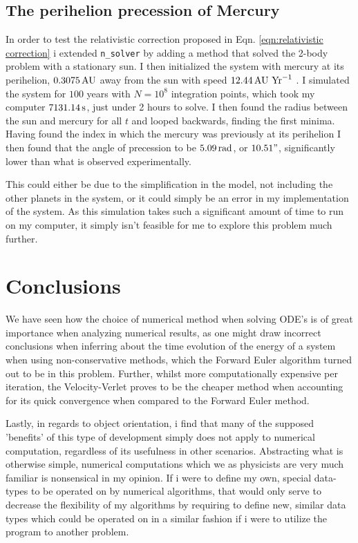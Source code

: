 \documentclass[10pt,showpacs,preprintnumbers,amsmath,amssymb,nofootinbib,aps,prl,twocolumn,groupedaddress,superscriptaddress,showkeys]{revtex4-1}
\begin{document}
\subsection{The perihelion precession of Mercury}
  In order to test the relativistic correction proposed in Eqn. \ref{eqn:relativistic correction} i extended \lstinline{n_solver} by adding a method that solved the 2-body problem with a stationary sun. I then initialized the system with mercury at its perihelion, $0.3075\,\textup{AU}$ away from the sun with speed $12.44\, \textup{AU Yr}^{-1}$ \cite{problem_set}. I simulated the system for $100$ years with $N=10^8$ integration points, which took my computer $7131.14\,\textup s$, just under 2 hours to solve. I then found the radius between the sun and mercury for all $t$ and looped backwards, finding the first minima. Having found the index in which the mercury was previously at its perihelion I then found that the angle of precession to be $5.09\,\textup{rad}$, or $10.51"$, significantly lower than what is observed experimentally.

  This could either be due to the simplification in the model, not including the other planets in the system, or it could simply be an error in my implementation of the system. As this simulation takes such a significant amount of time to run on my computer, it simply isn't feasible for me to explore this problem much further.


\section{Conclusions}
  We have seen how the choice of numerical method when solving ODE's is of great importance when analyzing numerical results, as one might draw incorrect conclusions when inferring about the time evolution of the energy of a system when using non-conservative methods, which the Forward Euler algorithm turned out to be in this problem. Further, whilst more computationally expensive per iteration, the Velocity-Verlet proves to be the cheaper method when accounting for its quick convergence when compared to the Forward Euler method.

  Lastly, in regards to object orientation, i find that many of the supposed 'benefits' of this type of development simply does not apply to numerical computation, regardless of its usefulness in other scenarios. Abstracting what is otherwise simple, numerical computations which we as physicists are very much familiar is nonsensical in my opinion. If i were to define my own, special data-types to be operated on by numerical algorithms, that would only serve to decrease the flexibility of my algorithms by requiring to define new, similar data types which could be operated on in a similar fashion if i were to utilize the program to another problem.
\end{document}
